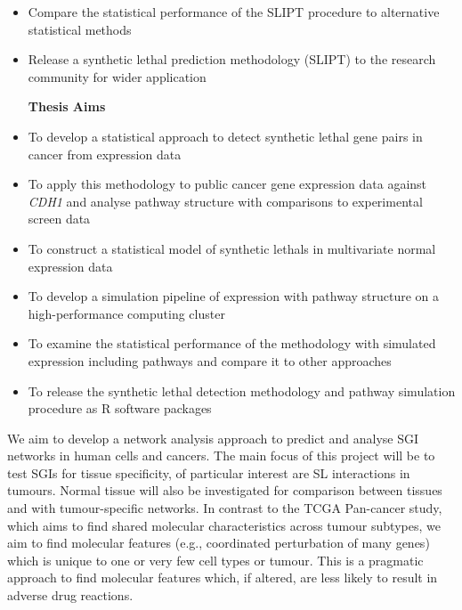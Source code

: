 \begin{itemize}
\item

Compare the statistical performance of the \gls{SLIPT} procedure to alternative statistical methods

\item 

Release a \gls{synthetic lethal} prediction methodology (\gls{SLIPT}) to the research
community for wider application 

\clearpage

\begin{center}
 \textbf{Thesis Aims}
\end{center}


\end{itemize}


  \begin{itemize}
   \item To develop a statistical approach to detect \gls{synthetic lethal} gene pairs in cancer from expression data

   \bigskip
   
   \item To apply this methodology to public cancer gene expression data against \textit{CDH1} and analyse pathway structure with comparisons to experimental screen data

   \bigskip
   
   \item To construct a statistical model of \glspl{synthetic lethal} in multivariate normal expression data
 
   \bigskip
   
   \item To develop a simulation pipeline of expression with pathway structure on a high-performance computing cluster 

   \bigskip
   
   \item To examine the statistical performance of the methodology with simulated expression including pathways and compare it to other approaches

   \bigskip
   
   \item To release the \gls{synthetic lethal} detection methodology and pathway simulation procedure as R software packages
   
  \end{itemize}

  
\iffalse
We aim to develop a network analysis approach to predict and analyse \gls{SGI} networks in human cells and cancers. The main focus of this project will be to test \glspl{SGI} for tissue specificity, of particular interest are SL interactions in tumours. Normal tissue will also be investigated for comparison between tissues and with tumour-specific networks. In contrast to the \gls{TCGA} Pan-cancer study, which aims to find shared molecular characteristics across tumour subtypes, we aim to find molecular features (e.g., coordinated perturbation of many genes) which is unique to one or very few cell types or tumour. This is a pragmatic approach to find molecular features which, if altered, are less likely to result in adverse drug reactions.


